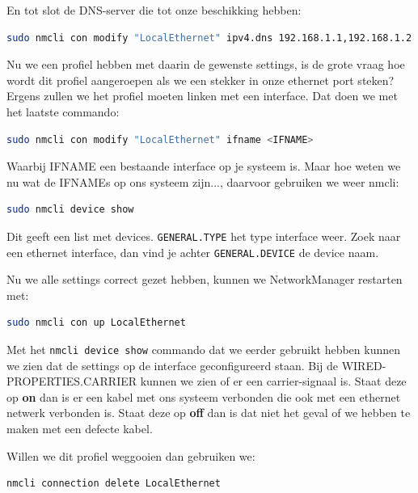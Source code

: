 En tot slot de DNS-server die tot onze beschikking hebben:
\begin{lstlisting}[language=bash]
sudo nmcli con modify "LocalEthernet" ipv4.dns 192.168.1.1,192.168.1.2
\end{lstlisting}

Nu we een profiel hebben met daarin de gewenste settings, is de grote vraag hoe wordt dit profiel aangeroepen als we een stekker in onze ethernet port steken? Ergens zullen we het profiel moeten linken met een interface. Dat doen we met het laatste commando:
\begin{lstlisting}[language=bash]
sudo nmcli con modify "LocalEthernet" ifname <IFNAME>
\end{lstlisting}
Waarbij IFNAME een bestaande interface op je systeem is. Maar hoe weten we nu wat de IFNAMEs op ons systeem zijn..., daarvoor gebruiken we weer nmcli:
\begin{lstlisting}[language=bash]
sudo nmcli device show
\end{lstlisting}
Dit geeft een list met devices. \texttt{GENERAL.TYPE} het type interface weer. Zoek naar een ethernet interface, dan vind je achter \texttt{GENERAL.DEVICE} de device naam.

Nu we alle settings correct gezet hebben, kunnen we NetworkManager restarten met:
\begin{lstlisting}[language=bash]
sudo nmcli con up LocalEthernet
\end{lstlisting}

Met het \texttt{nmcli device show} commando dat we eerder gebruikt hebben kunnen we zien dat de settings op de interface geconfigureerd staan. Bij de WIRED-PROPERTIES.CARRIER kunnen we zien of er een carrier-signaal is. Staat deze op \textbf{on} dan is er een kabel met ons systeem verbonden die ook met een ethernet netwerk verbonden is. Staat deze op \textbf{off} dan is dat niet het geval of we hebben te maken met een defecte kabel.

Willen we dit profiel weggooien dan gebruiken we:
\begin{lstlisting}[language=bash]
nmcli connection delete LocalEthernet
\end{lstlisting}

